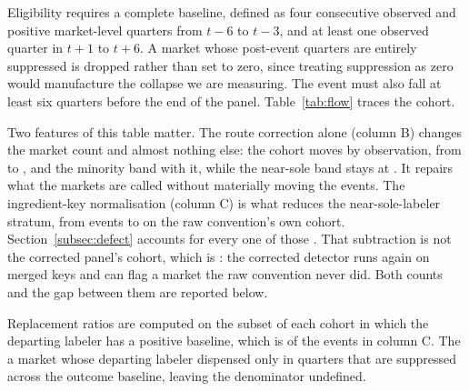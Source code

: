 \documentclass[pdflatex,sn-vancouver-num,Numbered]{sn-jnl}
\begin{document}
\begin{table}[htbp]
\caption{Events admitted by each detector specification, on the specification C panel. Each row
changes one element of the one above it. \textsuperscript{a}The specification used throughout
the paper. The near-sole column counts markets whose first detected exit has a departing share
of at least 95 percent, which is the quantity Table~\ref{tab:flow} then narrows to the observed
cohort.}\label{tab:detvar}

\end{table}

Eligibility requires a complete baseline, defined as four consecutive observed and positive
market-level quarters from $t-6$ to $t-3$, and at least one observed quarter in $t+1$ to $t+6$. A
market whose post-event quarters are entirely suppressed is dropped rather than set to zero,
since treating suppression as zero would manufacture the collapse we are measuring. The event must
also fall at least six quarters before the end of the panel. Table~\ref{tab:flow} traces the
cohort.

\begin{table}[htbp]
\small
\caption{Event flow under three market definitions. Each column is one specification applied
end to end, so the band counts sum to that column's cohort. A is the convention as commonly
applied; B corrects the route bucketing only; C additionally normalises the ingredient key and
is the specification used throughout.}\label{tab:flow}

\end{table}

Two features of this table matter. The route correction alone (column B) changes the market
count and almost nothing else: the cohort moves by \nRouteCohortDelta observation, from
\nSpecAObs to \nSpecBObs, and the minority band with it, while the near-sole band stays at
\nRawSole. It repairs what the markets are called without materially moving the events. The ingredient-key normalisation (column C) is what reduces the near-sole-labeler stratum,
from \nRawSoleW events to \nRemainSoleW on the raw convention's own cohort.
Section~\ref{subsec:defect} accounts for every one of those \nReclassSoleW. That subtraction is
not the corrected panel's cohort, which is \nTreated: the corrected detector runs again on
merged keys and can flag a market the raw convention never did. Both counts and the gap between
them are reported below.

Replacement ratios are computed on the subset of each cohort in which the departing labeler has
a positive baseline, which is \nReplEligible of the \nCohort events in column C. The
\nReplExcludedPhrase a market whose departing labeler dispensed only in quarters that are
suppressed across the outcome baseline, leaving the denominator undefined.
\end{document}
